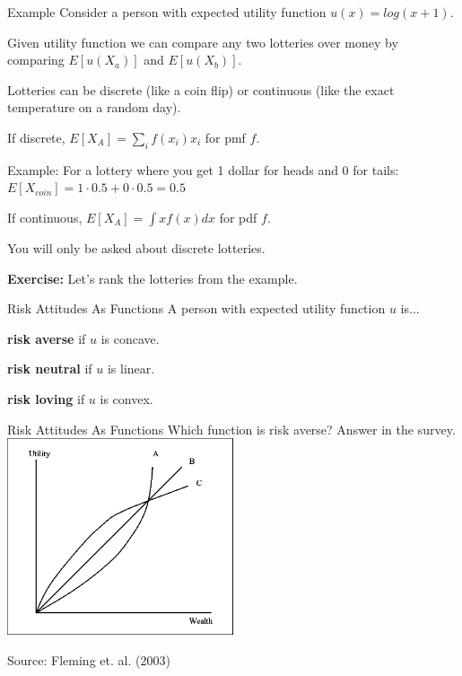 \documentclass[aspectratio=169]{beamer}
\newenvironment{wideitemize}{\itemize\addtolength{\itemsep}{10pt}}{\enditemize}
\begin{document}
\begin{frame}{Example}
Consider a person with expected utility function $u(x)=log(x+1)$. 
\begin{wideitemize}
    \item Given utility function we can compare any two lotteries over money by comparing $E[u(X_a)]$ and $E[u(X_b)]$.
    \item Lotteries can be discrete (like a coin flip) or continuous (like the exact temperature on a random day).
    \item If discrete, $E[X_A]=\sum_i f(x_i) x_i$ for pmf $f$.
    \begin{wideitemize}
        \item Example: For a lottery where you get 1 dollar for heads and 0 for tails: $E[X_{coin}] = 1\cdot 0.5 + 0 \cdot 0.5=0.5$
    \end{wideitemize}
    \item If continuous, $E[X_A]=\int xf(x)dx$ for pdf $f$.
    \item You will only be asked about discrete lotteries.
    \item \textbf{Exercise:} Let's rank the lotteries from the example.
\end{wideitemize}
\end{frame}

\begin{frame}{Risk Attitudes As Functions}
A person with expected utility function $u$ is...
\begin{wideitemize}
    \item \textbf{risk averse} if $u$ is concave.
    \item \textbf{risk neutral} if $u$ is linear.
    \item \textbf{risk loving} if $u$ is convex.
\end{wideitemize}

\end{frame}

\begin{frame}{Risk Attitudes As Functions}
    Which function is risk averse? Answer in the survey.
    \centering
    \includegraphics[width=0.5\textwidth]{Risk-Loving-A-Risk-Neutral-B-and-Risk-Averse-C-Utility-Curves.png}
    
    Source: Fleming et. al. (2003)
\end{frame}
\end{document}
